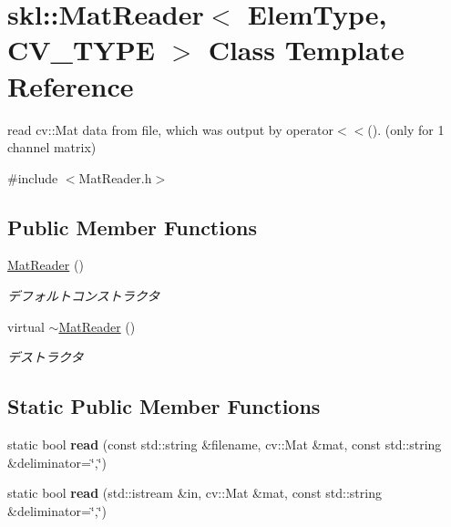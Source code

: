 \hypertarget{classskl_1_1_mat_reader}{}\section{skl\+:\+:Mat\+Reader$<$ Elem\+Type, C\+V\+\_\+\+T\+Y\+PE $>$ Class Template Reference}
\label{classskl_1_1_mat_reader}


read cv\+::\+Mat data from file, which was output by operator$<$$<$(). (only for 1 channel matrix)  




{\ttfamily \#include $<$Mat\+Reader.\+h$>$}

\subsection*{Public Member Functions}
\begin{DoxyCompactItemize}
\item 
\hypertarget{classskl_1_1_mat_reader_aad30f39108fd650864d1924c2d85fe65}{}\label{classskl_1_1_mat_reader_aad30f39108fd650864d1924c2d85fe65} 
\hyperlink{classskl_1_1_mat_reader_aad30f39108fd650864d1924c2d85fe65}{Mat\+Reader} ()
\begin{DoxyCompactList}\small\item\em デフォルトコンストラクタ \end{DoxyCompactList}\item 
\hypertarget{classskl_1_1_mat_reader_a9e6ad16602f3b5b2bc9118c4eb28d211}{}\label{classskl_1_1_mat_reader_a9e6ad16602f3b5b2bc9118c4eb28d211} 
virtual \hyperlink{classskl_1_1_mat_reader_a9e6ad16602f3b5b2bc9118c4eb28d211}{$\sim$\+Mat\+Reader} ()
\begin{DoxyCompactList}\small\item\em デストラクタ \end{DoxyCompactList}\end{DoxyCompactItemize}
\subsection*{Static Public Member Functions}
\begin{DoxyCompactItemize}
\item 
\hypertarget{classskl_1_1_mat_reader_a55b939ebe0e753199b1a186aaff9006f}{}\label{classskl_1_1_mat_reader_a55b939ebe0e753199b1a186aaff9006f} 
static bool {\bfseries read} (const std\+::string \&filename, cv\+::\+Mat \&mat, const std\+::string \&deliminator=\char`\"{},\char`\"{})
\item 
\hypertarget{classskl_1_1_mat_reader_a23765ba40ad293cc49ab2e82904ed6b1}{}\label{classskl_1_1_mat_reader_a23765ba40ad293cc49ab2e82904ed6b1} 
static bool {\bfseries read} (std\+::istream \&in, cv\+::\+Mat \&mat, const std\+::string \&deliminator=\char`\"{},\char`\"{})
\end{DoxyCompactItemize}


